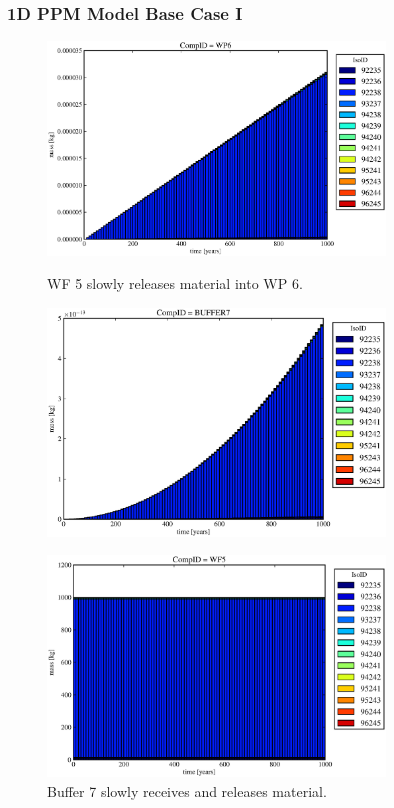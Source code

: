 \begin{frame}
\frametitle{1D PPM Model Base Case I}
\begin{figure}[ht]
\begin{minipage}[b]{0.45\linewidth}

  \includegraphics[width=0.8\textwidth]{./images/od2.eps}
  \caption[Case ODI Waste Form Contaminants.]{
    WF 5 slowly releases material into WP 6.
    }
  \label{fig:drIVwf5}
  \includegraphics[width=0.8\textwidth]{./images/od3.eps}
  \caption[Case ODI Buffer Contaminants]{
    Buffer 7 slowly receives and releases material.
    }
  \label{fig:drIVbuff}
\end{minipage}
\hspace{0.05\linewidth}
\begin{minipage}[b]{0.45\linewidth}
  \includegraphics[width=0.8\textwidth]{./images/od1.eps}

\end{minipage}
\end{figure}
\end{frame}
